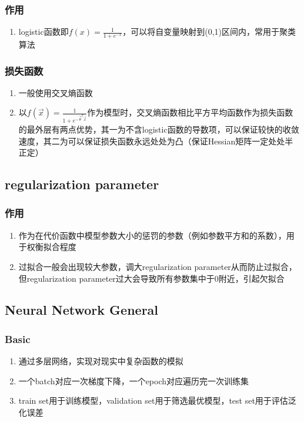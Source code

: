 \documentclass[onecolumn]{article}
\begin{document}
        \subsubsection{作用}
            \noindent
            \begin{enumerate}
                \item logistic函数即$f(x)=\frac{1}{1+e^{-x}}$，可以将自变量映射到(0,1)区间内，常用于聚类算法
            \end{enumerate}
        \subsubsection{损失函数}
            \noindent
            \begin{enumerate}
                \item 一般使用交叉熵函数
                \item 以$f(\vec{x})=\frac{1}{1+e^{-\vec{\theta}^T\vec{x}}}$作为模型时，交叉熵函数相比平方平均函数作为损失函数的最外层有两点优势，其一为不含logistic函数的导数项，可以保证较快的收敛速度，其二为可以保证损失函数永远处处为凸（保证Hessian矩阵一定处处半正定）
            \end{enumerate}
    \subsection{regularization parameter}
        \subsubsection{作用}
            \noindent
            \begin{enumerate}
                \item 作为在代价函数中模型参数大小的惩罚的参数（例如参数平方和的系数），用于权衡拟合程度
                \item 过拟合一般会出现较大参数，调大regularization parameter从而防止过拟合，但regularization parameter过大会导致所有参数集中于0附近，引起欠拟合
            \end{enumerate}
    \subsection{Neural Network General}
        \subsubsection{Basic}
            \noindent
            \begin{enumerate}
                \item 通过多层网络，实现对现实中复杂函数的模拟
                \item 一个batch对应一次梯度下降，一个epoch对应遍历完一次训练集
                \item train set用于训练模型，validation set用于筛选最优模型，test set用于评估泛化误差
            \end{enumerate}
\end{document}
